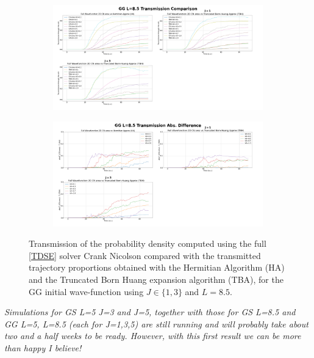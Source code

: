 \documentclass[11pt, a4paper]{article} %
\begin{document}
\begin{figure}[p]
  \centering
  \begin{subfigure}[b]{1.1\linewidth}
    \includegraphics[width=\linewidth]{Example_Results/GG_L_8.5_transmission.png}
  \end{subfigure}
  \begin{subfigure}[b]{1.1\linewidth}
    \includegraphics[width=\linewidth]{Example_Results/GG_L_8.5_errors.png}
  \end{subfigure}

  
  \caption{ Transmission of the probability density computed using the full \ref{TDSE} solver Crank Nicolson compared with the transmitted trajectory proportions obtained with the Hermitian Algorithm (HA) and the Truncated Born Huang expansion algorithm (TBA), for the GG initial wave-function using $J\in\{1,3\}$ and $L=8.5$. }
  \label{fig:transm_GG_L85}
\end{figure}

{\em Simulations for GS L=5 J=3 and J=5, together with those for GS L=8.5 and GG L=5, L=8.5 (each for J=1,3,5) are still running and will probably take about two and a half weeks to be ready. However, with this first result we can be more than happy I believe!}
\end{document}
